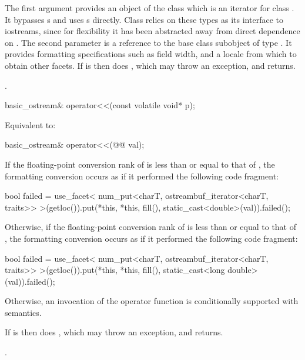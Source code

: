 \begin{itemdescr}
\pnum
The first argument provides an object of the
class which is an iterator for class .
It bypasses
s
and uses
s
directly.
Class
relies on these types as its
interface to iostreams, since for flexibility it has been abstracted
away from direct dependence on
.
The second parameter is a reference to the base class subobject of type
.
It provides formatting specifications such as field width, and
a locale from which to obtain other facets.
If
is
then does
,
which may throw an exception, and returns.

\pnum
\returns
{}.
\end{itemdescr}

%
\begin{itemdecl}
basic_ostream& operator<<(const volatile void* p);
\end{itemdecl}

\begin{itemdescr}
\pnum
\effects
Equivalent to: 
\end{itemdescr}

\begin{itemdecl}
basic_ostream& operator<<(@@ val);
\end{itemdecl}

\begin{itemdescr}
\pnum
\effects
If the floating-point conversion rank of 
is less than or equal to that of ,
the formatting conversion occurs as if it performed the following code fragment:
\begin{codeblock}
bool failed = use_facet<
  num_put<charT, ostreambuf_iterator<charT, traits>>
    >(getloc()).put(*this, *this, fill(),
      static_cast<double>(val)).failed();
\end{codeblock}
Otherwise,
if the floating-point conversion rank of 
is less than or equal to that of ,
the formatting conversion occurs as if it performed the following code fragment:
\begin{codeblock}
bool failed = use_facet<
  num_put<charT, ostreambuf_iterator<charT, traits>>
    >(getloc()).put(*this, *this, fill(),
      static_cast<long double>(val)).failed();
\end{codeblock}
Otherwise, an invocation of the operator function is conditionally supported
with 
semantics.

If  is  then does ,
which may throw an exception, and returns.

\pnum
\returns
{}.
\end{itemdescr}

